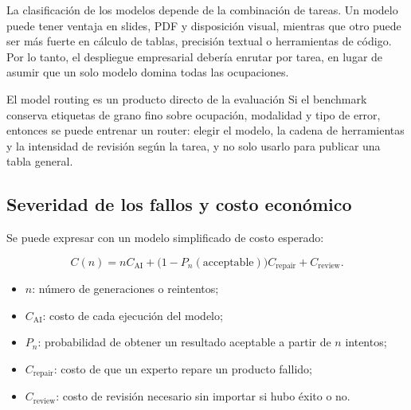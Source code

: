 \documentclass[a4paper]{article}
\begin{document}

La clasificación de los modelos depende de la combinación de tareas. Un modelo puede tener ventaja en slides, PDF y disposición visual, mientras que otro puede ser más fuerte en cálculo de tablas, precisión textual o herramientas de código. Por lo tanto, el despliegue empresarial debería enrutar por tarea, en lugar de asumir que un solo modelo domina todas las ocupaciones.

\begin{knowledgebox}{El model routing es un producto directo de la evaluación}
Si el benchmark conserva etiquetas de grano fino sobre ocupación, modalidad y tipo de error, entonces se puede entrenar un router: elegir el modelo, la cadena de herramientas y la intensidad de revisión según la tarea, y no solo usarlo para publicar una tabla general.
\end{knowledgebox}

\subsection{Severidad de los fallos y costo económico}




Se puede expresar con un modelo simplificado de costo esperado:

$$
C(n)=nC_{\mathrm{AI}}+
\bigl(1-P_n(\text{acceptable})\bigr)C_{\mathrm{repair}}+C_{\mathrm{review}}.
$$

\begin{itemize}
    \item $n$: número de generaciones o reintentos;
    \item $C_{\mathrm{AI}}$: costo de cada ejecución del modelo;
    \item $P_n$: probabilidad de obtener un resultado aceptable a partir de $n$ intentos;
    \item $C_{\mathrm{repair}}$: costo de que un experto repare un producto fallido;
    \item $C_{\mathrm{review}}$: costo de revisión necesario sin importar si hubo éxito o no.
\end{itemize}
\end{document}
